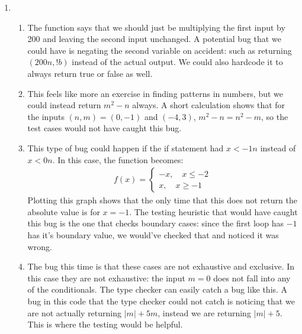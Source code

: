 \documentclass[12pt]{article}
\theoremstyle{definitionstyle}
\begin{document}
\begin{enumerate}[leftmargin=\labelsep]
        \newpage
        \item \begin{enumerate}[label=(\alph*)]
            \item The function says that we should just be multiplying the first input by 200 and leaving the second input unchanged. A potential bug that we could have is negating the second variable on accident: such as returning $(200n, !b)$ instead of the actual output. We could also hardcode it to always return true or false as well.
            \item This feels like more an exercise in finding patterns in numbers, but we could instead return $m^2 - n$ always. A short calculation shows that for the inputs $(n,m) = (0, -1)$ and $(-4, 3)$, $m^2 - n = n^2-m$, so the test cases would not have caught this bug. 
            \item This type of bug could happen if the if statement had $x < -1n$ instead of $x < 0n$. In this case, the function becomes:
            \begin{align*}
                f(x) = \begin{cases}
                    -x, \quad x \leq -2 \\
                    x, \quad x \geq -1
                \end{cases}
            \end{align*}
            Plotting this graph shows that the only time that this does not return the absolute value is for $x = -1$. The testing heuristic that would have caught this bug is the one that checks boundary cases: since the first loop has $-1$ has it's boundary value, we would've checked that and noticed it was wrong.
            \item The bug this time is that these cases are not exhaustive and exclusive. In this case they are not exhaustive: the input $m = 0$ does not fall into any of the conditionals. The type checker can easily catch a bug like this. A bug in this code that the type checker could not catch is noticing that we are not actually returning $|m| + 5m$, instead we are returning $|m| + 5$. This is where the testing would be helpful.

\end{enumerate}
\end{enumerate}
\end{document}
